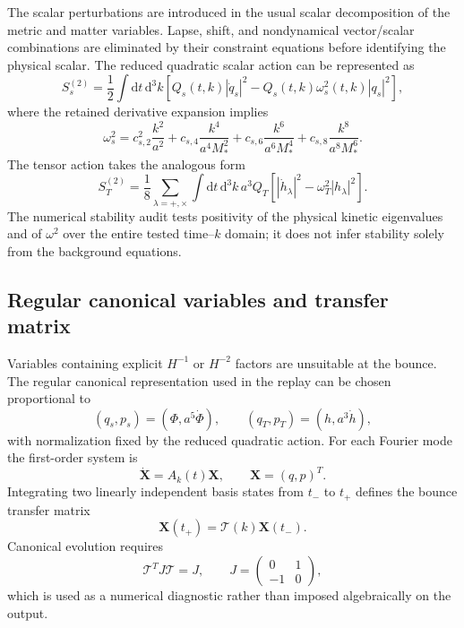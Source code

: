 \documentclass[12pt]{iopart}
\newcommand{\dd}{\mathrm{d}}
\newcommand{\cT}{\mathcal T}
\begin{document}
The scalar perturbations are introduced in the usual scalar decomposition of the metric and matter variables.  Lapse, shift, and nondynamical vector/scalar combinations are eliminated by their constraint equations before identifying the physical scalar.  The reduced quadratic scalar action can be represented as
\begin{equation}
S_s^{(2)}=\frac12\int\dd t\,\dd^3k\left[
Q_s(t,k)|\dot q_s|^2-Q_s(t,k)\omega_s^2(t,k)|q_s|^2
\right],
\label{eq:scalarquad}
\end{equation}
where the retained derivative expansion implies
\begin{equation}
\omega_s^2=c_{s,2}^2\frac{k^2}{a^2}
+c_{s,4}\frac{k^4}{a^4M_*^2}
+c_{s,6}\frac{k^6}{a^6M_*^4}
+c_{s,8}\frac{k^8}{a^8M_*^6}.
\label{eq:omegas}
\end{equation}
The tensor action takes the analogous form
\begin{equation}
S_T^{(2)}=\frac18\sum_{\lambda=+,\times}\int\dd t\,\dd^3k\,
a^3Q_T\left[|\dot h_\lambda|^2-\omega_T^2|h_\lambda|^2\right].
\label{eq:tensorquad}
\end{equation}
The numerical stability audit tests positivity of the physical kinetic eigenvalues and of $\omega^2$ over the entire tested time--$k$ domain; it does not infer stability solely from the background equations.

\subsection{Regular canonical variables and transfer matrix}

Variables containing explicit $H^{-1}$ or $H^{-2}$ factors are unsuitable at the bounce.  The regular canonical representation used in the replay can be chosen proportional to
\begin{equation}
(q_s,p_s)=(\Phi,a^5\dot\Phi),\qquad
(q_T,p_T)=(h,a^3\dot h),
\label{eq:canonicalvars}
\end{equation}
with normalization fixed by the reduced quadratic action.  For each Fourier mode the first-order system is
\begin{equation}
\dot{\bm X}=A_k(t)\bm X,
\qquad \bm X=(q,p)^T.
\label{eq:firstorder}
\end{equation}
Integrating two linearly independent basis states from $t_-$ to $t_+$ defines the bounce transfer matrix
\begin{equation}
\bm X(t_+)=\cT(k)\bm X(t_-).
\end{equation}
Canonical evolution requires
\begin{equation}
\cT^T J\cT=J,\qquad
J=\left(\begin{array}{cc}0&1\\-1&0\end{array}\right),
\label{eq:symplectic}
\end{equation}
which is used as a numerical diagnostic rather than imposed algebraically on the output.
\end{document}
